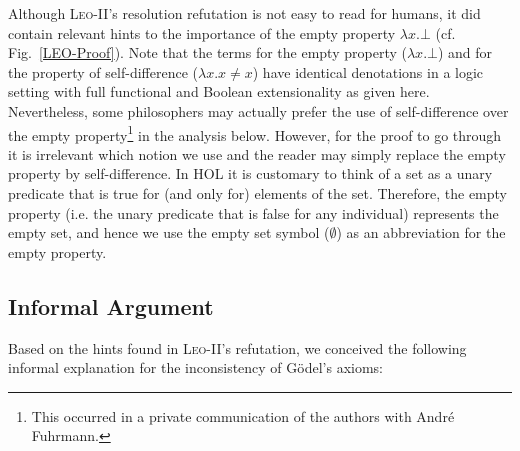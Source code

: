 \documentclass{article}
\begin{document}
Although \textsc{Leo-II}'s resolution refutation is not easy to read
for humans, it did contain relevant hints to the importance of the
empty property $\lambda x. \bot$ (cf. Fig.~\ref{LEO-Proof}).
%
Note that the terms for the empty property ($\lambda x. \bot$) and for the property of self-difference ($\lambda x.  x\not=x$) have identical denotations in a logic setting
with full functional and Boolean extensionality as given
here. Nevertheless, some philosophers may actually prefer the use of
self-difference over the empty property\footnote{This occurred in
  a private communication of the authors with Andr\'e Fuhrmann.} in
the analysis below. However, for the proof to go through it is
irrelevant which notion we use and the reader may simply replace the
empty property by self-difference. In HOL it is customary to think of a set as a unary predicate that is true for (and only for) elements of the set. Therefore, the empty property (i.e. the unary predicate that is false for any individual) represents the empty set, and hence we use the empty set symbol ($\emptyset$) as an abbreviation for the empty property. 



\subsection{Informal Argument} \label{sec:arg1}
Based on the hints found in \textsc{Leo-II}'s refutation, we conceived the following informal explanation for the inconsistency of G\"odel's axioms:
\end{document}
